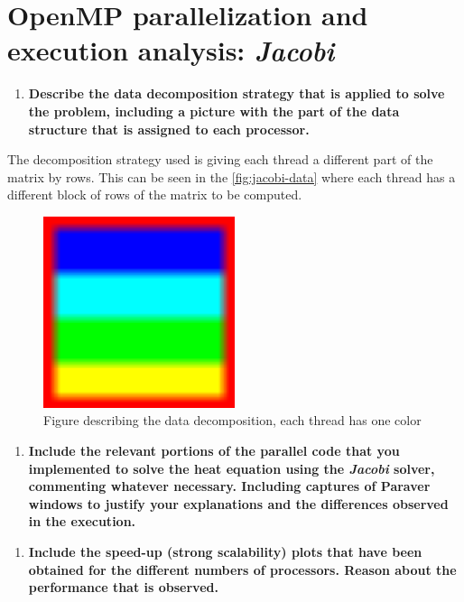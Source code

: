 \documentclass[a4paper]{article}
\newenvironment{questionenum}{%
\setlist[enumerate]{resume}
\restartlist{enumerate}
\newcommand{\question}[1]{
\begin{enumerate}
	\item\bfseries ##1
\end{enumerate}
}}{%
}
\begin{document}
\section{OpenMP parallelization and execution analysis: \emph{Jacobi}}
\begin{questionenum}
	\question{Describe the data decomposition strategy that is applied to solve the problem, including a picture with the part of the data structure that is assigned to each processor.}
	
	The decomposition strategy used is giving each thread a different part of the matrix by rows. This can be seen in the \autoref{fig:jacobi-data} where each thread has a different block of rows of the matrix to be computed. 
	
	\begin{figure}[H]
		\centering
		\includegraphics[width=0.5\textwidth]{images/jacobi/data}
		\caption{Figure describing the data decomposition, each thread has one color}
		\label{fig:jacobi-data}
	\end{figure}
	
	\question{Include the relevant portions of the parallel code that you implemented to solve the heat equation using the \emph{Jacobi} solver, commenting whatever necessary. Including captures of Paraver windows to justify your explanations and the differences observed in the execution.}
	
	\question{Include the speed-up (strong scalability) plots that have been obtained for the different numbers of processors. Reason about the performance that is observed.}
\end{questionenum}
\end{document}
